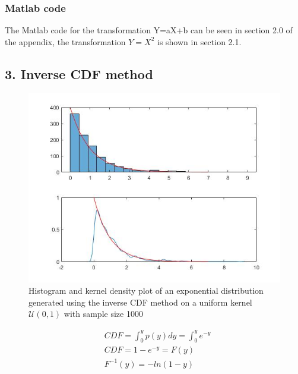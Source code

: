 \documentclass[twoside,twocolumn]{article}
\begin{document}
\subsubsection{Matlab code} %
The Matlab code for the transformation Y=aX+b can be seen in section 2.0 of the appendix, the transformation $Y=X^2$ is shown in section 2.1.

\subsection{3. Inverse CDF method}
\begin{figure}[h]
  \centering
    \includegraphics[width=\linewidth]{3exp}
  \caption{Histogram and kernel density plot of an exponential distribution generated using the inverse CDF method on a uniform kernel $\mathcal{U}(0,1)$ with sample size 1000}
  \label{fig:3exp}
\end{figure}
 
\begin{equation}
\label{eq:3cdf}
\begin{split}
&CDF = \int_0^yp(y)dy=\int_0^ye^{-y}\\
&CDF = 1- e^{-y} = F(y)\\
&F^{-1}(y) = -ln(1-y)\\
\end{split}
\end{equation} 
\end{document}
